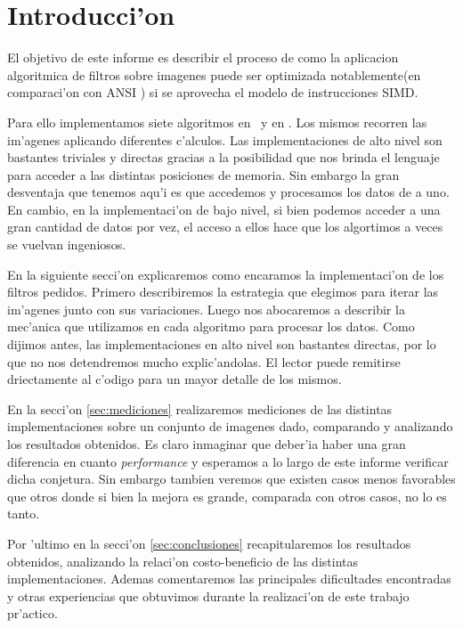\section{Introducci'on}

El objetivo de este informe es describir el proceso de como la aplicacion algoritmica de filtros sobre imagenes
puede ser optimizada notablemente(en comparaci'on con ANSI \C) si se aprovecha el modelo de instrucciones SIMD. 

Para ello implementamos siete algoritmos en \C\ y en \ass. Los mismos recorren las im'agenes aplicando diferentes c'alculos. Las implementaciones de alto nivel son bastantes triviales y directas gracias a la posibilidad que nos brinda el lenguaje para acceder a las distintas posiciones de memoria. Sin embargo la gran desventaja que tenemos aqu'i es que accedemos y procesamos los datos de a uno. En cambio, en la implementaci'on de bajo nivel, si bien podemos acceder a una gran cantidad de datos por vez, el acceso a ellos hace que los algortimos a veces se vuelvan ingeniosos. 

En la siguiente secci'on explicaremos como encaramos la implementaci'on de los filtros pedidos. Primero describiremos la estrategia que elegimos para iterar las im'agenes junto con sus variaciones. Luego nos abocaremos a describir la mec'anica que utilizamos en cada algoritmo para procesar los datos. Como dijimos antes, las implementaciones en alto nivel son bastantes directas, por lo que no nos detendremos mucho explic'andolas. El lector puede remitirse driectamente al c'odigo para un mayor detalle de los mismos.

En la secci'on \ref{sec:mediciones} realizaremos mediciones de las distintas implementaciones sobre un conjunto de imagenes dado, comparando y analizando los resultados obtenidos. Es claro inmaginar que deber'ia haber una  gran diferencia en cuanto \textit{performance} y esperamos a lo largo de este informe verificar dicha conjetura. Sin embargo tambien veremos que existen casos menos favorables que otros donde si bien la mejora es grande, comparada con otros casos, no lo es tanto. 

Por 'ultimo en la secci'on \ref{sec:conclusiones} recapitularemos los resultados obtenidos, analizando la relaci'on costo-beneficio de las distintas implementaciones. Ademas comentaremos las principales dificultades encontradas y otras experiencias que obtuvimos durante la realizaci'on de este trabajo pr'actico.